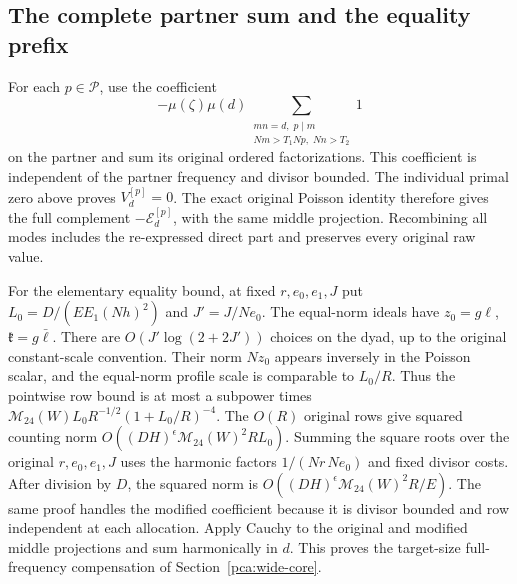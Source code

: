 \subsection{The complete partner sum and the equality prefix}
\label{pca:wide-prefix-proof}

For each \(p\in\mathcal P\), use the coefficient
\[
 -\mu(\zeta)\mu(d)
 \sum_{\substack{mn=d,\;p\mid m\\Nm>T_1Np,\;Nn>T_2}}1
\]
on the partner and sum its original ordered factorizations.
This coefficient is independent of the partner frequency
and divisor bounded. The individual primal zero above
proves \(V_d^{[p]}=0\). The exact original Poisson identity
therefore gives the full complement
\(-\mathcal E_d^{[p]}\), with the same middle projection.
Recombining all modes includes the re-expressed direct
part and preserves every original raw value.

For the elementary equality bound, at fixed \(r,e_0,e_1,J\)
put \(L_0=D/(E E_1(Nh)^2)\) and \(J'=J/Ne_0\).
The equal-norm ideals have \(z_0=g\ell\), \(\mathfrak k=g\bar\ell\).
There are \(O(J'\log(2+2J'))\) choices on the dyad, up to
the original constant-scale convention. Their norm \(Nz_0\)
appears inversely in the Poisson scalar, and the equal-norm
profile scale is comparable to \(L_0/R\).
Thus the pointwise row bound is at most a subpower times
\(\mathcal M_{24}(W)L_0 R^{-1/2}(1+L_0/R)^{-4}\).
The \(O(R)\) original rows give squared counting norm
\(O((DH)^\epsilon\mathcal M_{24}(W)^2R L_0)\).
Summing the square roots over the original \(r,e_0,e_1,J\)
uses the harmonic factors \(1/(Nr\,Ne_0)\) and fixed
divisor costs. After division by \(D\), the squared norm
is \(O((DH)^\epsilon\mathcal M_{24}(W)^2R/E)\).
The same proof handles the modified coefficient because it
is divisor bounded and row independent at each allocation.
Apply Cauchy to the original and modified middle projections
and sum harmonically in \(d\). This proves the target-size
full-frequency compensation of Section~\ref{pca:wide-core}.

